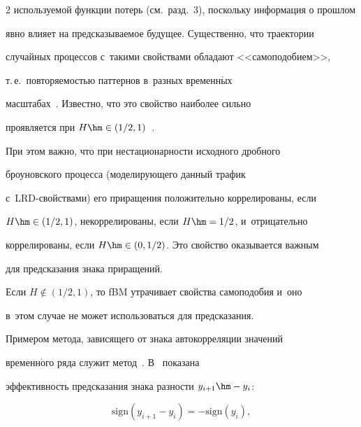 \begin{multicols}{2}
используемой функции потерь (см.\ разд.~3), поскольку информация о прошлом 


явно влияет на предсказываемое будущее. Существенно, что траектории 


случайных процессов с~такими свойствами обладают <<самоподобием>>, 


т.\,е.\ повторяемостью паттернов в~разных временн$\acute{\mbox{ы}}$х 


масштабах~\cite{10-fr, 17-fr}. Известно, что это свойство наиболее сильно 


проявляется при $H\hm\in  (1/2, 1)$~\cite{16-fr, 18-fr}. 


  


  При этом важно, что при нестационарности исходного дробного 


броуновского процесса (моделирующего данный трафик  


с~LRD-свой\-ст\-ва\-ми) его приращения положительно коррелированы, если 


$H\hm\in (1/2, 1)$, некоррелированы, если $H\hm = 1/2$, и~отрицательно 


коррелированы, если $H\hm\in (0, 1/2)$. Это свойство оказывается важным 


для предсказания знака приращений. 


  


   Если $H\not\in (1/2,1)$, то fBM утрачивает свойства самоподобия и~оно 


в~этом случае не может использоваться для предсказания. 


  


  Примером метода, зависящего от знака автокорреляции значений 


временн$\acute{\mbox{о}}$го ряда служит метод~\cite{19-fr}. В~\cite{19-fr, 20-fr} показана 


эффективность предсказания знака разности $y_{i+1}\hm- y_i$:





\vspace*{2pt}





\noindent


  \begin{equation}


  \mathrm{sign}\left(y_{i+1}- y_i\right)=- \mathrm{sign}\left(y_i\right),           



\end{equation}
\end{multicols}
